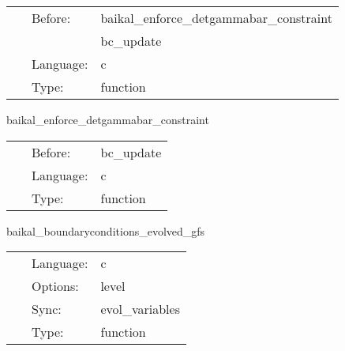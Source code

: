 \hspace{5mm}

 \begin{tabular*}{160mm}{cll} 
~ & Before:  & baikal\_enforce\_detgammabar\_constraint \\ 
~& ~ &bc\_update\\ 
~ & Language:  & c \\ 
~ & Type:  & function \\ 
\end{tabular*} 


\vspace{5mm}


\hspace{5mm} baikal\_enforce\_detgammabar\_constraint 

\hspace{5mm}{\it enforce detgammabar = detgammahat (= 1 in cartesian) } 


\hspace{5mm}

 \begin{tabular*}{160mm}{cll} 
~ & Before:  & bc\_update \\ 
~ & Language:  & c \\ 
~ & Type:  & function \\ 
\end{tabular*} 


\vspace{5mm}


\hspace{5mm} baikal\_boundaryconditions\_evolved\_gfs 

\hspace{5mm}{\it apply boundary conditions and perform amr+interprocessor synchronization } 


\hspace{5mm}

 \begin{tabular*}{160mm}{cll} 
~ & Language:  & c \\ 
~ & Options:  & level \\ 
~ & Sync:  & evol\_variables \\ 
~ & Type:  & function \\ 
\end{tabular*} 


\vspace{5mm}


